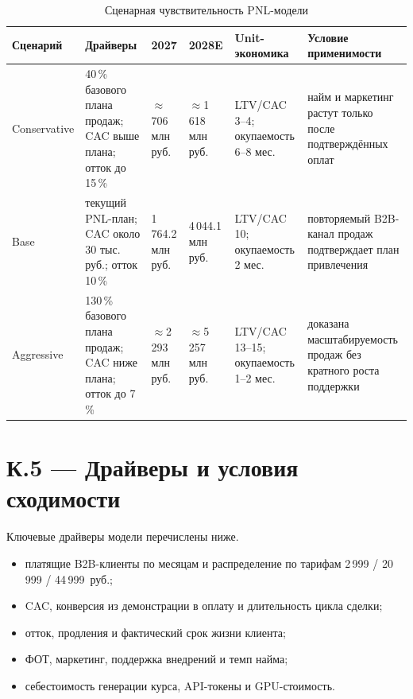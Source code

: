 \begin{table}[H]
  \caption{Сценарная чувствительность PNL-модели}
  \label{tab:appendix-finance-sensitivity}
  \centering
  \begingroup
  \scriptsize
  \setlength{\tabcolsep}{1.6pt}
  \renewcommand{\arraystretch}{1.12}
  \begin{tabular}{|P{1.8cm}|P{3.0cm}|P{2.0cm}|P{2.0cm}|P{2.0cm}|P{3.0cm}|}
  \hline
  \textbf{Сценарий}
    & \textbf{Драйверы}
    & \textbf{2027}
    & \textbf{2028E}
    & \textbf{Unit-экономика}
    & \textbf{Условие применимости} \\
  \hline
  Conservative
    & 40\,\% базового плана продаж; CAC выше плана; отток до 15\,\%
    & $\approx$706 млн руб.
    & $\approx$1\,618 млн руб.
    & LTV/CAC 3--4; окупаемость 6--8 мес.
    & найм и маркетинг растут только после подтверждённых оплат \\
  \hline
  Base
    & текущий PNL-план; CAC около 30 тыс. руб.; отток 10\,\%
    & 1\,764.2 млн руб.
    & 4\,044.1 млн руб.
    & LTV/CAC 10; окупаемость 2 мес.
    & повторяемый B2B-канал продаж подтверждает план привлечения \\
  \hline
  Aggressive
    & 130\,\% базового плана продаж; CAC ниже плана; отток до 7\,\%
    & $\approx$2\,293 млн руб.
    & $\approx$5\,257 млн руб.
    & LTV/CAC 13--15; окупаемость 1--2 мес.
    & доказана масштабируемость продаж без кратного роста поддержки \\
  \hline
  \end{tabular}
  \endgroup
\end{table}

\section*{К.5 — Драйверы и условия сходимости}

Ключевые драйверы модели перечислены ниже.
\begin{itemize}
  \item платящие B2B-клиенты по месяцам и распределение по тарифам
    2\,999 / 20\,999 / 44\,999~руб.;
  \item CAC, конверсия из демонстрации в оплату и длительность цикла сделки;
  \item отток, продления и фактический срок жизни клиента;
  \item ФОТ, маркетинг, поддержка внедрений и темп найма;
  \item себестоимость генерации курса, API-токены и GPU-стоимость.
\end{itemize}


